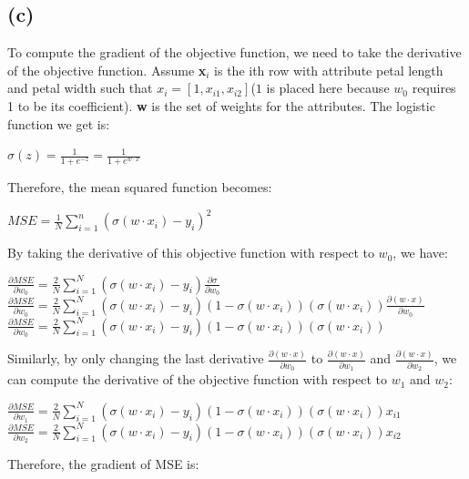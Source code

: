 \documentclass[12pt]{article}
\begin{document}
\subsection*{(c)}
To compute the gradient of the objective function, we need to take the derivative of the objective function. Assume \textbf{x$_i$} is the ith row with attribute petal length and petal width such that $x_i = [1,x_{i1},x_{i2}]$($1$ is placed here because $w_0$ requires 1 to be its coefficient). \textbf{w} is the set of weights for the attributes. The logistic function we get is:
\begin{center}
    $\sigma(z) = \frac{1}{1+e^{-z}} = \frac{1}{1+e^{w \cdot x}}$
\end{center}
Therefore, the mean squared function becomes: 
\begin{center}
    $MSE = \frac{1}{N} \sum_{i = 1}^{n}(\sigma(w\cdot x_i)-y_i)^2$
\end{center}
By taking the derivative of this objective function with respect to $w_0$, we have: 
\begin{center}
    $\frac{\partial MSE}{\partial w_0} = \frac{2}{N}\sum_{i=1}^{N}(\sigma(w \cdot x_i)-y_i)\frac{\partial \sigma}{\partial w_0}$ \\ 
    $\frac{\partial MSE}{\partial w_0} = \frac{2}{N}\sum_{i=1}^{N}(\sigma(w \cdot x_i)-y_i)(1-\sigma(w \cdot x_i))(\sigma(w\cdot x_i))\frac{\partial (w\cdot x)}{\partial w_0}$ \\ 
    $\frac{\partial MSE}{\partial w_0} = \frac{2}{N}\sum_{i=1}^{N}(\sigma(w \cdot x_i)-y_i)(1-\sigma(w \cdot x_i))(\sigma(w\cdot x_i))$
\end{center}
Similarly, by only changing the last derivative $\frac{\partial(w\cdot x)}{\partial w_0}$ to $\frac{\partial(w\cdot x)}{\partial w_1}$ and $\frac{\partial(w\cdot x)}{\partial w_2}$, we can compute the derivative of the objective function with respect to $w_1$ and $w_2$:
\begin{center}
    $\frac{\partial MSE}{\partial w_1} = \frac{2}{N}\sum_{i=1}^{N}(\sigma(w \cdot x_i)-y_i)(1-\sigma(w \cdot x_i))(\sigma(w\cdot x_i))x_{i1}$
    $\frac{\partial MSE}{\partial w_2} = \frac{2}{N}\sum_{i=1}^{N}(\sigma(w \cdot x_i)-y_i)(1-\sigma(w \cdot x_i))(\sigma(w\cdot x_i))x_{i2}$
\end{center} 
Therefore, the gradient of MSE is: 
\end{document}

